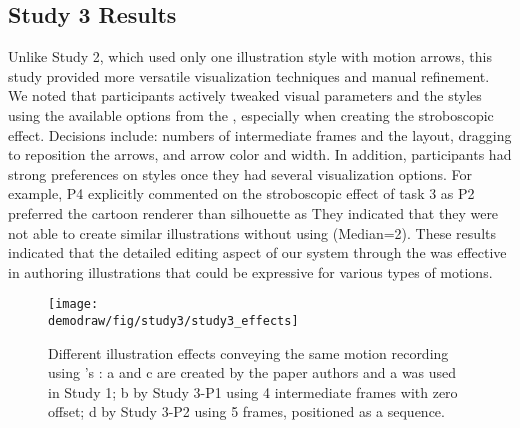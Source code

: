 \subsection{Study 3 Results}

%
%
Unlike Study 2, which used only one illustration style with motion arrows, this study provided more versatile visualization techniques and manual refinement. We noted that participants actively tweaked visual parameters and the styles using the available options from the \phaseII{}, especially when creating the stroboscopic effect. Decisions include: numbers of intermediate frames and the layout, dragging to reposition the arrows, and arrow color and width.
%
In addition, participants had strong preferences on styles once they had several visualization options. For example, P4 explicitly commented on the stroboscopic effect of task 3 as  P2 preferred the cartoon renderer than silhouette as 
%
They indicated that they were not able to create similar illustrations without using \systemname{} (Median=2).
%
These results indicated that the detailed editing aspect of our system through the \phaseII{} was effective in authoring illustrations that could be expressive for various types of motions.

\begin{figure}[t]
  \centering
  \texttt{[image: \\demodraw/fig/study3/study3\_effects]}
  \caption{Different illustration effects conveying the same motion recording using \systemname{}'s \phaseII{}: a and c are created by the paper authors and a was used in Study 1; b by Study 3-P1 using 4 intermediate frames with zero offset; d by Study 3-P2 using 5 frames, positioned as a sequence.}
  \label{fig:study3_effects}
\end{figure}


%

